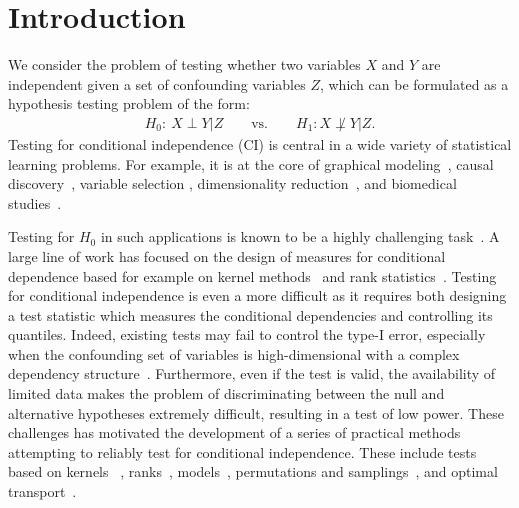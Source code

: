 \section{Introduction}
We consider the problem of testing whether two variables $X$ and $Y$ are independent given a set of confounding variables $Z$, which can be formulated as a hypothesis testing problem of the form:
\begin{align*}
    H_0:~ X\perp Y | Z\qquad\text{vs.}\qquad H_1:X\not\perp Y | Z.
\end{align*}
Testing for conditional independence (CI) is central in a wide variety of statistical learning problems. For example, it is at the core of graphical modeling~\citep{lauritzen1996graphical,koller2009probabilistic}, causal discovery~\citep{pearl2009causal,glymour2019review}, variable selection \citep{candes2018panning}, dimensionality reduction~\citep{li2018sufficient}, and biomedical studies~\citep{richardson1993bayesian,dobra2004sparse,markowetz2007inferring}. 
 
Testing for $H_0$ in such applications is known to be a highly challenging task~\citep{gcm2020,neykov2021minimax}. A large line of work has focused on the design of measures for conditional dependence based for example on kernel methods~\cite{fukumizu2008kernel,Sheng2019OnDA,NEURIPS2020_f340f1b1,huang2020kernel} and rank statistics~\cite{azadkia2021simple,shi2021azadkia}. Testing for conditional independence is even a more difficult as it requires both designing a test statistic which measures the conditional dependencies and controlling its quantiles. Indeed, existing tests may fail to control the type-I error, especially when the confounding set of variables is high-dimensional with a complex dependency structure~\cite{bergsma2004testing}. Furthermore, even if the test is valid, the availability of limited data makes the problem of discriminating between the null and alternative hypotheses extremely difficult, resulting in a test of low power. These challenges has motivated the development of a series of practical methods attempting to reliably test for conditional independence. These include tests based on kernels ~\citep{zhang2012kernel,doran2014permutation,strobl2019approximate,Zhang2017FeaturetoFeatureRF}, ranks~\cite{runge2018conditional,mittag2018nonparametric}, models~\citep{sen2017modelpowered,sen2018mimic,chalupka2018fast,gcm2020}, permutations and  samplings~\citep{berrett2020conditional,candes2018panning,BellotS19, shi2021double,javanmard2021pearson},
and optimal transport~\cite{warren2021wasserstein}.



